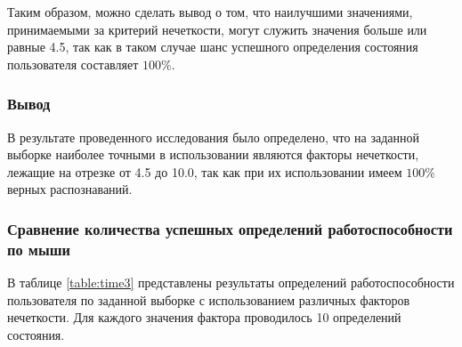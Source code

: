 Таким образом, можно сделать вывод о том, что наилучшими значениями, принимаемыми за критерий нечеткости, могут служить значения больше или равные 4.5, так как в таком случае шанс успешного определения состояния пользователя составляет $100\%$.

\subsubsection*{Вывод}

В результате проведенного исследования было определено, что на заданной выборке наиболее точными в использовании являются факторы нечеткости, лежащие на отрезке от 4.5 до 10.0, так как при их использовании имеем $100\%$ верных распознаваний.

\subsubsection{Сравнение количества успешных определений работоспособности по мыши}

В таблице \ref{table:time3} представлены результаты определений работоспособности пользователя по заданной выборке с использованием различных факторов нечеткости. Для каждого значения фактора проводилось 10 определений состояния.

